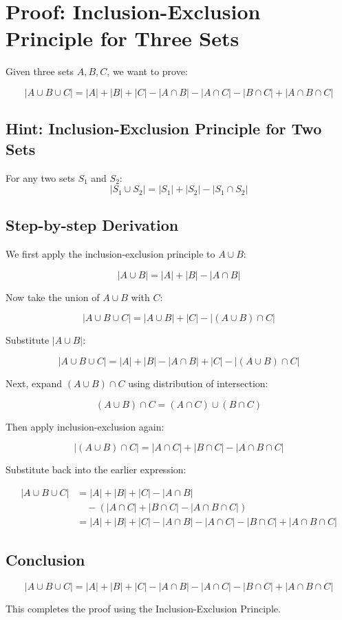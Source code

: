 \documentclass{article}
\begin{document}
\section*{Proof: Inclusion-Exclusion Principle for Three Sets}

Given three sets \( A, B, C \), we want to prove:

\[
|A \cup B \cup C| = |A| + |B| + |C| 
- |A \cap B| - |A \cap C| - |B \cap C| 
+ |A \cap B \cap C|
\]

\subsection*{Hint: Inclusion-Exclusion Principle for Two Sets}

For any two sets \( S_1 \) and \( S_2 \):
\[
|S_1 \cup S_2| = |S_1| + |S_2| - |S_1 \cap S_2|
\]

\subsection*{Step-by-step Derivation}

We first apply the inclusion-exclusion principle to \( A \cup B \):

\[
|A \cup B| = |A| + |B| - |A \cap B|
\]

Now take the union of \( A \cup B \) with \( C \):

\[
|A \cup B \cup C| = |A \cup B| + |C| - |(A \cup B) \cap C|
\]

Substitute \( |A \cup B| \):

\[
|A \cup B \cup C| = |A| + |B| - |A \cap B| + |C| - |(A \cup B) \cap C|
\]

Next, expand \( (A \cup B) \cap C \) using distribution of intersection:

\[
(A \cup B) \cap C = (A \cap C) \cup (B \cap C)
\]

Then apply inclusion-exclusion again:

\[
|(A \cup B) \cap C| = |A \cap C| + |B \cap C| - |A \cap B \cap C|
\]

Substitute back into the earlier expression:

\begin{align*}
|A \cup B \cup C| &= |A| + |B| + |C| - |A \cap B| \\
&\quad - \left(|A \cap C| + |B \cap C| - |A \cap B \cap C|\right) \\
&= |A| + |B| + |C| 
- |A \cap B| - |A \cap C| - |B \cap C| 
+ |A \cap B \cap C|
\end{align*}

\subsection*{Conclusion}

\[
\boxed{
|A \cup B \cup C| = |A| + |B| + |C| 
- |A \cap B| - |A \cap C| - |B \cap C| 
+ |A \cap B \cap C|
}
\]

This completes the proof using the Inclusion-Exclusion Principle.
\end{document}
